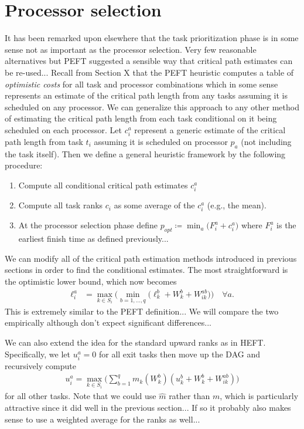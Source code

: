 \documentclass[12pt]{article}
\begin{document}
\section{Processor selection}
\label{sect.processor_selection}

It has been remarked upon elsewhere that the task prioritization phase is in some sense not as important as the processor selection. Very few reasonable alternatives but PEFT suggested a sensible way that critical path estimates can be re-used... Recall from Section X that the PEFT heuristic computes a table of {\em optimistic costs} for all task and processor combinations which in some sense represents an estimate of the critical path length from any tasks assuming it is scheduled on any processor. We can generalize this approach to any other method of estimating the critical path length from each task conditional on it being scheduled on each processor. Let $c_i^a$ represent a generic estimate of the critical path length from task $t_i$ assuming it is scheduled on processor $p_a$ (not including the task itself). Then we define a general heuristic framework by the following procedure:
\begin{enumerate}
	\item Compute all conditional critical path estimates $c_i^a$
	\item Compute all task ranks $c_i$ as some average of the $c_i^a$ (e.g., the mean).
	\item At the processor selection phase define $p_{opt} \coloneqq \min_{a} \big( F_i^a + c_i^a \big)$ where $F_i^a$ is the earliest finish time as defined previously...
\end{enumerate} 

We can modify all of the critical path estimation methods introduced in previous sections in order to find the conditional estimates. The most straightforward is the optimistic lower bound, which now becomes
\begin{align}
\ell_i^a &= \max_{k \in S_i} \bigg( \min_{b = 1, \dots, q} \big( \ell_k^b + W_k^b + W_{ik}^{ab} \big)  \bigg) \quad \forall a. \label{eq.opt_lookahead} 
\end{align}
This is extremely similar to the PEFT definition... We will compare the two empirically although don't expect significant differences...

We can also extend the idea for the standard upward ranks as in HEFT. Specifically, we let $u_i^a = 0$ for all exit tasks then move up the DAG and recursively compute 
\begin{align*}
u_i^a = \max_{k \in S_i} \bigg( \sum_{b = 1}^{q} m_k(W_k^b) (u_k^b + W_k^b + W_{ik}^{ab}) \bigg) 
\end{align*} 
for all other tasks. Note that we could use $\hat{m}$ rather than $m$, which is particularly attractive since it did well in the previous section... If so it probably also makes sense to use a weighted average for the ranks as well...
\end{document}
